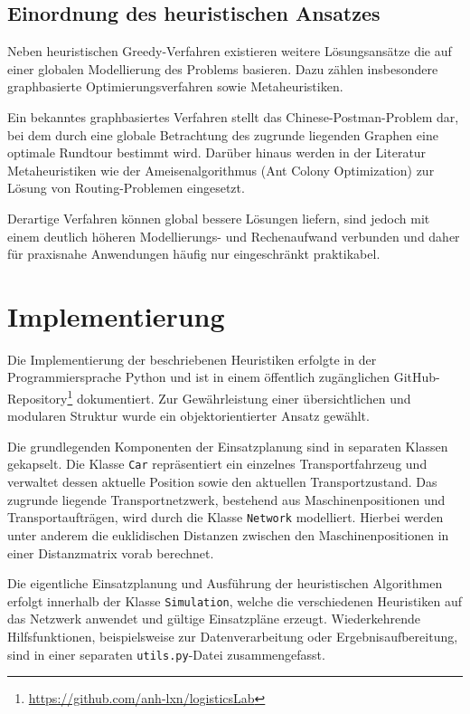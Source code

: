 \documentclass[a4paper,10pt]{article}
\begin{document}
\subsection{Einordnung des heuristischen Ansatzes}

Neben heuristischen Greedy-Verfahren existieren weitere Lösungsansätze die auf einer globalen Modellierung 
des Problems basieren. Dazu zählen insbesondere graphbasierte Optimierungsverfahren sowie Metaheuristiken.

Ein bekanntes graphbasiertes Verfahren stellt das Chinese-Postman-Problem dar, bei dem durch eine
globale Betrachtung des zugrunde liegenden Graphen eine optimale Rundtour bestimmt wird.
Darüber hinaus werden in der Literatur Metaheuristiken wie der Ameisenalgorithmus
(Ant Colony Optimization) zur Lösung von Routing-Problemen eingesetzt.

Derartige Verfahren können global bessere Lösungen liefern, sind jedoch mit einem deutlich höheren
Modellierungs- und Rechenaufwand verbunden und daher für praxisnahe Anwendungen häufig nur
eingeschränkt praktikabel.


\section{Implementierung}

Die Implementierung der beschriebenen Heuristiken erfolgte in der Programmiersprache Python und
ist in einem öffentlich zugänglichen GitHub-Repository\footnote{\url{https://github.com/anh-lxn/logisticsLab}} dokumentiert.
Zur Gewährleistung einer übersichtlichen und modularen Struktur wurde ein objektorientierter Ansatz gewählt.

Die grundlegenden Komponenten der Einsatzplanung sind in separaten Klassen gekapselt. Die Klasse
\texttt{Car} repräsentiert ein einzelnes Transportfahrzeug und verwaltet dessen aktuelle Position sowie
den aktuellen Transportzustand. Das zugrunde liegende Transportnetzwerk, bestehend aus
Maschinenpositionen und Transportaufträgen, wird durch die Klasse \texttt{Network} modelliert.
Hierbei werden unter anderem die euklidischen Distanzen zwischen den Maschinenpositionen in einer
Distanzmatrix vorab berechnet.

Die eigentliche Einsatzplanung und Ausführung der heuristischen Algorithmen erfolgt innerhalb der
Klasse \texttt{Simulation}, welche die verschiedenen Heuristiken auf das Netzwerk anwendet und
gültige Einsatzpläne erzeugt. Wiederkehrende Hilfsfunktionen, beispielsweise zur Datenverarbeitung
oder Ergebnisaufbereitung, sind in einer separaten \texttt{utils.py}-Datei zusammengefasst.
\end{document}
